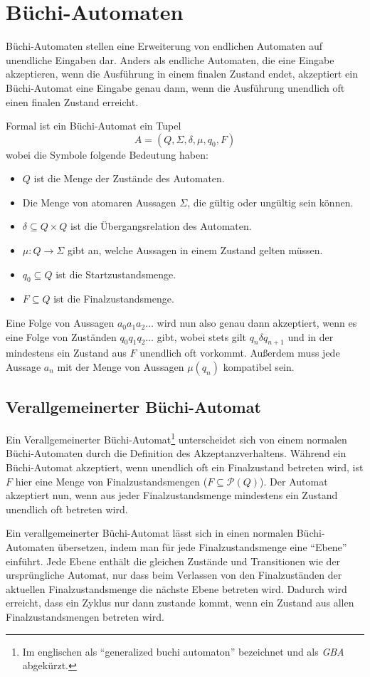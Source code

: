 \section{Büchi-Automaten}
Büchi-Automaten stellen eine Erweiterung von endlichen Automaten auf unendliche Eingaben dar\cite{buchibasics}.
Anders als endliche Automaten, die eine Eingabe akzeptieren, wenn die Ausführung in einem finalen Zustand endet, akzeptiert ein Büchi-Automat eine Eingabe genau dann, wenn die Ausführung unendlich oft einen finalen Zustand erreicht.

Formal ist ein Büchi-Automat ein Tupel
\[ A = (Q,\Sigma,\delta,\mu,q_0,F) \]
wobei die Symbole folgende Bedeutung haben:
\begin{itemize}
  \item $Q$ ist die Menge der Zustände des Automaten.
  \item Die Menge von atomaren Aussagen $\Sigma$, die gültig oder ungültig sein können.
  \item $\delta\subseteq Q\times Q$ ist die Übergangsrelation des Automaten.
  \item $\mu : Q\rightarrow\Sigma$ gibt an, welche Aussagen in einem Zustand gelten müssen.
  \item $q_0\subseteq Q$ ist die Startzustandsmenge.
  \item $F\subseteq Q$ ist die Finalzustandsmenge.
\end{itemize}
Eine Folge von Aussagen $a_0a_1a_2\dots$ wird nun also genau dann akzeptiert, wenn es eine Folge von Zuständen $q_0q_1q_2\dots$ gibt, wobei stets gilt $q_n\delta q_{n+1}$ und in der mindestens ein Zustand aus $F$ unendlich oft vorkommt.
Außerdem muss jede Aussage $a_n$ mit der Menge von Aussagen $\mu(q_n)$ kompatibel sein.

\subsection{Verallgemeinerter Büchi-Automat}
Ein Verallgemeinerter Büchi-Automat\footnote{Im englischen als "`generalized buchi automaton"' bezeichnet und als \emph{GBA} abgekürzt.} unterscheidet sich von einem normalen Büchi-Automaten durch die Definition des Akzeptanzverhaltens.
Während ein Büchi-Automat akzeptiert, wenn unendlich oft ein Finalzustand betreten wird, ist $F$ hier eine Menge von Finalzustandsmengen ($F\subseteq\mathcal{P}(Q)$).
Der Automat akzeptiert nun, wenn aus jeder Finalzustandsmenge mindestens ein Zustand unendlich oft betreten wird.

Ein verallgemeinerter Büchi-Automat lässt sich in einen normalen Büchi-Automaten übersetzen, indem man für jede Finalzustandsmenge eine "`Ebene"' einführt.
Jede Ebene enthält die gleichen Zustände und Transitionen wie der ursprüngliche Automat, nur dass beim Verlassen von den Finalzuständen der aktuellen Finalzustandsmenge die nächste Ebene betreten wird.
Dadurch wird erreicht, dass ein Zyklus nur dann zustande kommt, wenn ein Zustand aus allen Finalzustandsmengen betreten wird.

